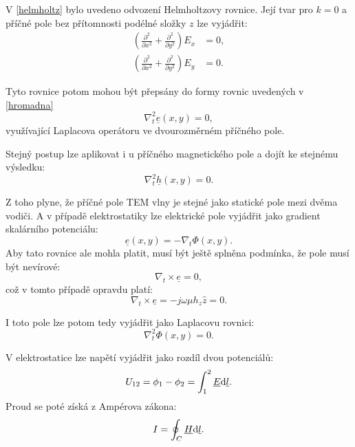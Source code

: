 \documentclass[12pt,a4paper,oneside]{article}
\numberwithin{equation}{section} %
\numberwithin{figure}{section} %
\numberwithin{table}{section} %
\newcommand{\faz}[1]{{\underline{#1}}} %
\begin{document}
V \ref{helmholtz} bylo uvedeno odvození Helmholtzovy rovnice. Její tvar pro $k = 0$ a příčné pole bez přítomnosti podélné složky $z$ lze vyjádřit:
\begin{subequations}
\begin{align}
\left( \frac{\partial ^2}{\partial x^2} + \frac{\partial ^2}{\partial y^2} \right) E_x &= 0 ,
\\
\left( \frac{\partial ^2}{\partial x^2} + \frac{\partial ^2}{\partial y^2} \right) E_y &= 0 .
\end{align}
\end{subequations}

Tyto rovnice potom mohou být přepsány do formy rovnic uvedených v \ref{hromadna}
\begin{equation}
\nabla ^2_t \faz{e} (x, y) = 0 ,
\end{equation}
využívající Laplacova operátoru ve dvourozměrném příčného pole.

Stejný postup lze aplikovat i u příčného magnetického pole a dojít ke stejnému výsledku:
\begin{equation}
\nabla ^2_t \faz{h} (x, y) = 0 .
\end{equation}

Z toho plyne, že příčné pole TEM vlny je stejné jako statické pole mezi dvěma vodiči. A v případě elektrostatiky lze elektrické pole vyjádřit jako gradient skalárního potenciálu:
\begin{equation}
\faz{e} (x, y) = - \nabla _t \Phi (x, y) .
\end{equation}
Aby tato rovnice ale mohla platit, musí být ještě splněna podmínka, že pole musí být nevírové:
\begin{equation}
\nabla _t \times \faz{e} = 0 ,
\end{equation}
což v tomto případě opravdu platí:
\begin{equation}
\nabla _t \times \faz{e} = - j \omega \mu h_z \hat{z} = 0 .
\end{equation}

I toto pole lze potom tedy vyjádřit jako Laplacovu rovnici:
\begin{equation}
\nabla ^2_t \Phi (x,y) = 0 .
\end{equation}

V elektrostatice lze napětí vyjádřit jako rozdíl dvou potenciálů:
\begin{equation}
\label{napeti}
U_{12} = \phi _1 - \phi _2 = \int ^2_1 \faz{E} \ud \faz{l} .
\end{equation}
Proud se poté získá z Ampérova zákona:
\begin{equation}
\label{amper}
I = \oint _C \faz{H} \ud \faz{l}.
\end{equation}
\end{document}
